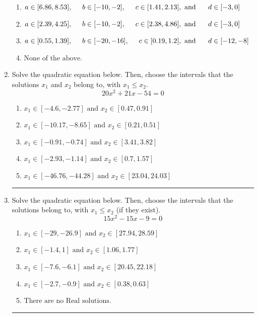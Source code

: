 \documentclass[14pt]{extbook}
\newcommand{\litem}[1]{\item#1\hspace*{-1cm}\rule{\textwidth}{0.4pt}}
\begin{document}
\begin{enumerate}
{\begin{enumerate}[label=\Alph*.]
\item \( a \in [6.86, 8.53], \hspace*{5mm} b \in [-10, -2], \hspace*{5mm} c \in [1.41, 2.13], \text{ and } \hspace*{5mm} d \in [-3, 0] \)
\item \( a \in [2.39, 4.25], \hspace*{5mm} b \in [-10, -2], \hspace*{5mm} c \in [2.38, 4.86], \text{ and } \hspace*{5mm} d \in [-3, 0] \)
\item \( a \in [0.55, 1.39], \hspace*{5mm} b \in [-20, -16], \hspace*{5mm} c \in [0.19, 1.2], \text{ and } \hspace*{5mm} d \in [-12, -8] \)
\item \( \text{None of the above.} \)

\end{enumerate} }
\litem{
Solve the quadratic equation below. Then, choose the intervals that the solutions $x_1$ and $x_2$ belong to, with $x_1 \leq x_2$.\[ 20x^{2} +21 x -54 = 0 \]\begin{enumerate}[label=\Alph*.]
\item \( x_1 \in [-4.6, -2.77] \text{ and } x_2 \in [0.47, 0.91] \)
\item \( x_1 \in [-10.17, -8.65] \text{ and } x_2 \in [0.21, 0.51] \)
\item \( x_1 \in [-0.91, -0.74] \text{ and } x_2 \in [3.41, 3.82] \)
\item \( x_1 \in [-2.93, -1.14] \text{ and } x_2 \in [0.7, 1.57] \)
\item \( x_1 \in [-46.76, -44.28] \text{ and } x_2 \in [23.04, 24.03] \)

\end{enumerate} }
\litem{
Solve the quadratic equation below. Then, choose the intervals that the solutions belong to, with $x_1 \leq x_2$ (if they exist).\[ 15x^{2} -15 x -9 = 0 \]\begin{enumerate}[label=\Alph*.]
\item \( x_1 \in [-29, -26.9] \text{ and } x_2 \in [27.94, 28.59] \)
\item \( x_1 \in [-1.4, 1] \text{ and } x_2 \in [1.06, 1.77] \)
\item \( x_1 \in [-7.6, -6.1] \text{ and } x_2 \in [20.45, 22.18] \)
\item \( x_1 \in [-2.7, -0.9] \text{ and } x_2 \in [0.38, 0.63] \)
\item \( \text{There are no Real solutions.} \)


\end{enumerate}}
\end{enumerate}
\end{document}
